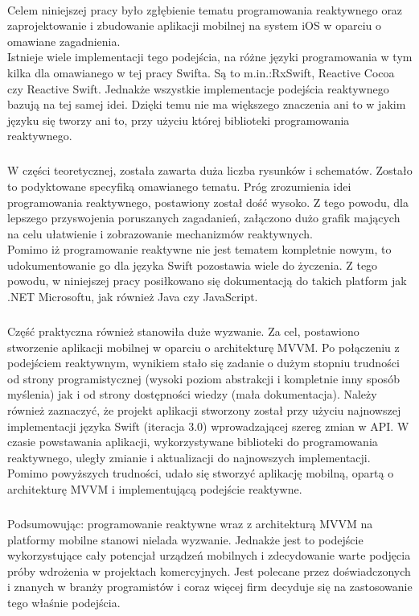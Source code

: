 \documentclass[12pt,oneside,a4paper]{report}
\begin{document}
\paragraph{}Celem niniejszej pracy było zgłębienie tematu programowania reaktywnego oraz zaprojektowanie i zbudowanie aplikacji mobilnej na system iOS w oparciu o omawiane zagadnienia.\\
Istnieje wiele implementacji tego podejścia, na różne języki programowania w tym kilka dla omawianego w tej pracy Swifta. Są to m.in.:RxSwift, Reactive Cocoa czy Reactive Swift. Jednakże wszystkie implementacje podejścia reaktywnego bazują na tej samej idei. Dzięki temu nie ma większego znaczenia ani to w jakim języku się tworzy ani to, przy użyciu której biblioteki programowania reaktywnego.
\subparagraph{}W części teoretycznej, została zawarta duża liczba rysunków i schematów. Zostało to podyktowane specyfiką omawianego tematu. Próg zrozumienia idei programowania reaktywnego, postawiony został dość wysoko. Z tego powodu, dla lepszego przyswojenia poruszanych zagadanień, załączono dużo grafik mających na celu ułatwienie i zobrazowanie mechanizmów reaktywnych.\\
Pomimo iż programowanie reaktywne nie jest tematem kompletnie nowym, to udokumentowanie go dla języka Swift pozostawia wiele do życzenia. Z tego powodu, w niniejszej pracy posiłkowano się dokumentacją do takich platform jak .NET Microsoftu, jak również Java czy JavaScript. 
\subparagraph{}Część praktyczna również stanowiła duże wyzwanie. Za cel, postawiono stworzenie aplikacji mobilnej w oparciu o architekturę MVVM. Po połączeniu z podejściem reaktywnym, wynikiem stało się zadanie o dużym stopniu trudności od strony programistycznej (wysoki poziom abstrakcji i kompletnie inny sposób myślenia) jak i od strony dostępności wiedzy (mała dokumentacja).
Należy również zaznaczyć, że projekt aplikacji stworzony został przy użyciu najnowszej implementacji języka Swift (iteracja 3.0) wprowadzającej szereg zmian w API. W czasie powstawania aplikacji, wykorzystywane biblioteki do programowania reaktywnego, uległy zmianie i aktualizacji do najnowszych implementacji.\\
Pomimo powyższych trudności, udało się stworzyć aplikację mobilną, opartą o architekturę MVVM i implementującą podejście reaktywne.
\subparagraph{}Podsumowując: programowanie reaktywne wraz z architekturą MVVM na platformy mobilne stanowi nielada wyzwanie. Jednakże jest to podejście wykorzystujące cały potencjał urządzeń mobilnych i zdecydowanie warte podjęcia próby wdrożenia w projektach komercyjnych. Jest polecane przez doświadczonych i znanych w branży programistów i coraz więcej firm decyduje się na zastosowanie tego właśnie podejścia\cite{reactivexio}.
\end{document}
